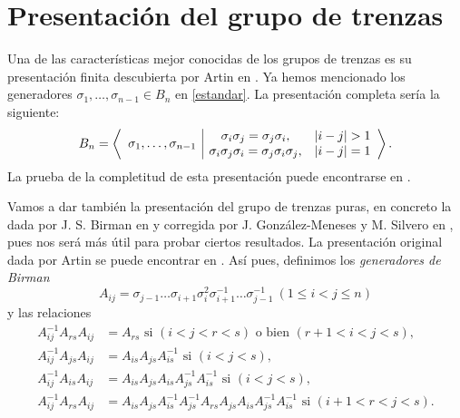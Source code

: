 \documentclass[TFG.tex]{subfiles}
\begin{document}

\newpage

\section{Presentación del grupo de trenzas}
Una de las características mejor conocidas de los grupos de trenzas es su presentación finita descubierta por Artin en \cite{Artin}. Ya hemos mencionado los generadores $\sigma_1,\dots,\sigma_{n-1}\in B_n$ en \ref{estandar}. La presentación completa sería la siguiente:
\begin{equation}\label{presentacion}
B_n=\left\langle\begin{array}{c| c c}
\multirow{2}{*}{$\sigma_1,\dots,\sigma_{n-1}$} & \sigma_i\sigma_j=\sigma_j\sigma_i, & |i-j|>1\\
& \sigma_i\sigma_j\sigma_i=\sigma_j\sigma_i\sigma_j, & |i-j|=1
\end{array}\right\rangle.
\end{equation}
La prueba de la completitud de esta presentación puede encontrarse en \cite{Magnus}. 

Vamos a dar también la presentación del grupo de trenzas puras, en concreto la dada por J. S. Birman en \cite{Birman} y corregida por J. González-Meneses y M. Silvero en \cite{polynomial}, pues nos será más útil para probar ciertos resultados. La presentación original dada por Artin se puede encontrar en \cite{Artin}. Así pues, definimos los \emph{generadores de Birman}
\begin{equation}\label{birman}
A_{ij}=\sigma_{j-1}\dots\sigma_{i+1}\sigma_i^2\sigma_{i+1}^{-1}\dots\sigma_{j-1}^{-1}\ (1\leq i<j\leq n)
\end{equation}
y las relaciones %
\begin{align*}
A_{ij}^{-1}A_{rs}A_{ij}&=A_{rs}\text{ si } (i<j<r<s)\text{ o bien } (r+1<i<j<s),\\
A_{ij}^{-1}A_{js}A_{ij}&=A_{is}A_{js}A_{is}^{-1} \text{ si } (i<j<s),\\
A_{ij}^{-1}A_{is}A_{ij}&=A_{is}A_{js}A_{is}A_{js}^{-1}A_{is}^{-1}\text{ si } (i<j<s),\\
A_{ij}^{-1}A_{rs}A_{ij}&=A_{is}A_{js}A_{is}^{-1}A_{js}^{-1}A_{rs}A_{js}A_{is}A_{js}^{-1}A_{is}^{-1}\text{ si } (i+1<r<j<s).
\end{align*}
\end{document}
